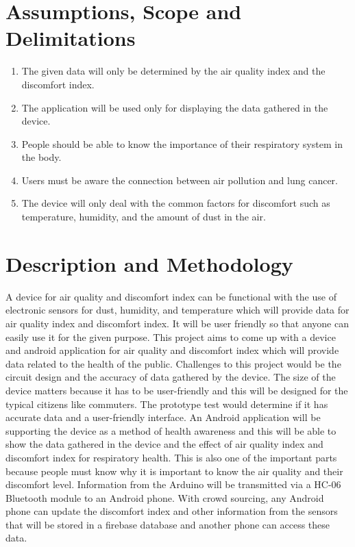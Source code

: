 \section{Assumptions, Scope and Delimitations}

\begin{enumerate}
\item The given data will only be determined by the air quality index and the discomfort index.

\item The application will be used only for displaying the data gathered in the device.

\item People should be able to know the importance of their respiratory system in the body.

\item Users must be aware the connection between air pollution and lung cancer.

\item The device will only deal with the common factors for discomfort such as temperature, humidity, and the amount of dust in the air.

\end{enumerate}

\section{Description and Methodology}

A device for air quality and discomfort index can be functional with the use of electronic sensors for dust, humidity, and temperature which will provide data for air quality index and discomfort index. It will be user friendly so that anyone can easily use it for the given purpose. This project aims to come up with a device and android application for air quality and discomfort index which will provide data related to the health of the public. Challenges to this project would be the circuit design and the accuracy of data gathered by the device. The size of the device matters because it has to be user-friendly and this will be designed for the typical citizens like commuters. The prototype test would determine if it has accurate data and a user-friendly interface. An Android application will be supporting the device as a method of health awareness and this will be able to show the data gathered in the device and the effect of air quality index and discomfort index for respiratory health. This is also one of the important parts because people must know why it is important to know the air quality and their discomfort level. Information from the Arduino will be transmitted via a HC-06 Bluetooth module to an Android phone. With crowd sourcing, any Android phone can update the discomfort index and other information from the sensors that will be stored in a firebase database and another phone can access these data. %

